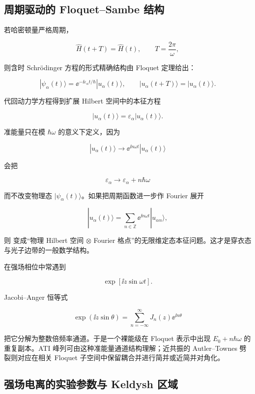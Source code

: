 \subsection{周期驱动的 Floquet--Sambe 结构}

若哈密顿量严格周期，

\[
\hat H(t+T)=\hat H(t),
\qquad T=\frac{2\pi}{\omega},
\]

则含时 Schr\"odinger 方程的形式精确结构由 Floquet 定理给出：

\begin{equation}
|\psi_\alpha(t)\rangle
=\ee^{-\ii\varepsilon_\alpha t/\hbar}
|u_\alpha(t)\rangle,
\qquad
|u_\alpha(t+T)\rangle=|u_\alpha(t)\rangle.
\label{eq:floquet-form}
\end{equation}

代回动力学方程得到扩展 Hilbert 空间中的本征方程

\begin{equation}
[\hat H(t)-\ii\hbar\partial_t]
|u_\alpha(t)\rangle
=\varepsilon_\alpha|u_\alpha(t)\rangle.
\label{eq:floquet-eigenproblem}
\end{equation}

准能量只在模 \(\hbar\omega\) 的意义下定义，因为

\[
|u_\alpha(t)\rangle
\longrightarrow
 \ee^{\ii n\omega t}|u_\alpha(t)\rangle
\]

会把

\[
\varepsilon_\alpha
\longrightarrow
\varepsilon_\alpha+n\hbar\omega
\]

而不改变物理态 \(|\psi_\alpha(t)\rangle\)。如果把周期函数进一步作 Fourier 展开

\[
|u_\alpha(t)\rangle
=\sum_{n\in\mathbb Z}
 \ee^{\ii n\omega t}|u_{\alpha n}\rangle,
\]

则  变成“物理 Hilbert 空间 \(\otimes\) Fourier 格点”的无限维定态本征问题。这才是穿衣态与光子边带的一般数学结构。

在强场相位中常遇到

\[
\exp[\ii z\sin\omega t].
\]

Jacobi--Anger 恒等式

\[
\exp(\ii z\sin\theta)
=
\sum_{n=-\infty}^{\infty}
J_n(z)\ee^{\ii n\theta}
\]

把它分解为整数倍频率通道。于是一个裸能级在 Floquet 表示中出现 \(E_0+n\hbar\omega\) 的重复副本。ATI 峰列可由这种准能量通道结构理解；近共振的 Autler--Townes 劈裂则对应在相关 Floquet 子空间中保留耦合并进行简并或近简并对角化。

\subsection{强场电离的实验参数与 Keldysh 区域}\label{sec:strong-field-experiments}

